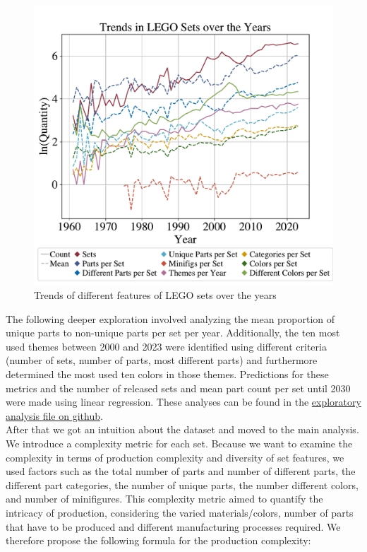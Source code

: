 \documentclass{article}
\theoremstyle{plain}
\theoremstyle{definition}
\theoremstyle{remark}
\begin{document}
\begin{figure}[ht]
 \vskip 0.2in
 \begin{center}
 \centerline{\includegraphics[width=\columnwidth]{../Images/Exploration.pdf}}
\caption{Trends of different features of LEGO sets over the years}
\label{icml-historical}
 \end{center}
 \vskip -0.2in
\end{figure}
The following deeper exploration involved analyzing the mean proportion of unique parts to non-unique parts per set per year. Additionally, the ten most used themes between 2000 and 2023 were identified using different criteria (number of sets, number of parts, most different parts) and furthermore determined the most used ten colors in those themes. Predictions for these metrics and the number of released sets and mean part count per set until 2030 were made using linear regression. These analyses can be found in the \href{https://github.com/eddiebeach99/Data_Literacy/blob/main/Analysis/exploratory_analysis.ipynb}{exploratory analysis file on github}. \\
After that we got an intuition about the dataset and moved to the main analysis. We introduce a complexity metric for each set. Because we want to examine the complexity in terms of production complexity and diversity of set features, we used factors such as the total number of parts and number of different parts, the different part categories, the number of unique parts, the number different colors, and number of minifigures. This complexity metric aimed to quantify the intricacy of production, considering the varied materials/colors, number of parts that have to be produced and different manufacturing processes required. We therefore propose the following formula for the production complexity:
\end{document}
